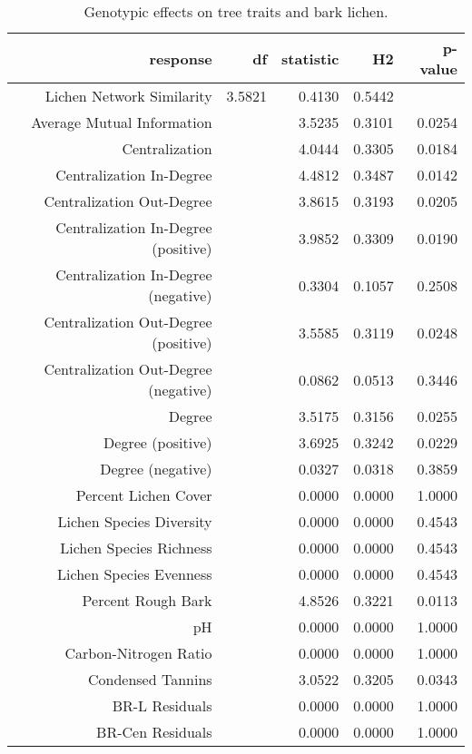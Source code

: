 \begin{table}[ht]
\centering
\begin{tabular}{rrrrr}
  \hline
response & df & statistic & H2 & p-value \\ 
  \hline
Lichen Network Similarity & 3.5821 & 0.4130 & 0.5442 &  \\ 
  Average Mutual Information &  & 3.5235 & 0.3101 & 0.0254 \\ 
  Centralization &  & 4.0444 & 0.3305 & 0.0184 \\ 
  Centralization In-Degree &  & 4.4812 & 0.3487 & 0.0142 \\ 
  Centralization Out-Degree &  & 3.8615 & 0.3193 & 0.0205 \\ 
  Centralization In-Degree (positive) &  & 3.9852 & 0.3309 & 0.0190 \\ 
  Centralization In-Degree (negative) &  & 0.3304 & 0.1057 & 0.2508 \\ 
  Centralization Out-Degree (positive) &  & 3.5585 & 0.3119 & 0.0248 \\ 
  Centralization Out-Degree (negative) &  & 0.0862 & 0.0513 & 0.3446 \\ 
  Degree &  & 3.5175 & 0.3156 & 0.0255 \\ 
  Degree (positive) &  & 3.6925 & 0.3242 & 0.0229 \\ 
  Degree (negative) &  & 0.0327 & 0.0318 & 0.3859 \\ 
  Percent Lichen Cover &  & 0.0000 & 0.0000 & 1.0000 \\ 
  Lichen Species Diversity &  & 0.0000 & 0.0000 & 0.4543 \\ 
  Lichen Species Richness &  & 0.0000 & 0.0000 & 0.4543 \\ 
  Lichen Species Evenness &  & 0.0000 & 0.0000 & 0.4543 \\ 
  Percent Rough Bark &  & 4.8526 & 0.3221 & 0.0113 \\ 
  pH &  & 0.0000 & 0.0000 & 1.0000 \\ 
  Carbon-Nitrogen Ratio &  & 0.0000 & 0.0000 & 1.0000 \\ 
  Condensed Tannins &  & 3.0522 & 0.3205 & 0.0343 \\ 
  BR-L Residuals &  & 0.0000 & 0.0000 & 1.0000 \\ 
  BR-Cen Residuals &  & 0.0000 & 0.0000 & 1.0000 \\ 
   \hline
\end{tabular}
\caption{Genotypic effects on tree traits and bark lichen.} 
\label{tab:h2_table}
\end{table}
